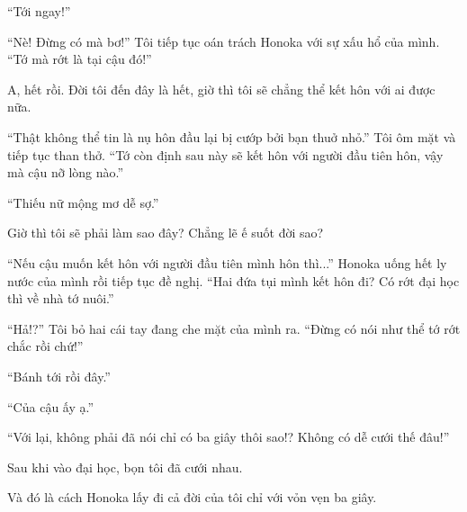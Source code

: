 {``Tới ngay!''

``Nè! Đừng có mà bơ!'' Tôi tiếp tục oán trách Honoka với sự xấu hổ của
mình. ``Tớ mà rớt là tại cậu đó!''

A, hết rồi. Đời tôi đến đây là hết, giờ thì tôi sẽ chẳng thể kết hôn với
ai được nữa.

``Thật không thể tin là nụ hôn đầu lại bị cướp bởi bạn thuở nhỏ.'' Tôi
ôm mặt và tiếp tục than thở. ``Tớ còn định sau này sẽ kết hôn với người
đầu tiên hôn, vậy mà cậu nỡ lòng nào.''

``Thiếu nữ mộng mơ dễ sợ.''

Giờ thì tôi sẽ phải làm sao đây? Chẳng lẽ ế suốt đời sao?

``Nếu cậu muốn kết hôn với người đầu tiên mình hôn thì...'' Honoka uống
hết ly nước của mình rồi tiếp tục đề nghị. ``Hai đứa tụi mình kết hôn
đi? Có rớt đại học thì về nhà tớ nuôi.''

``Hả!?'' Tôi bỏ hai cái tay đang che mặt của mình ra. ``Đừng có nói như
thể tớ rớt chắc rồi chứ!''

``Bánh tới rồi đây.''

``Của cậu ấy ạ.''

``Với lại, không phải đã nói chỉ có ba giây thôi sao!? Không có dễ cưới
thế đâu!''

Sau khi vào đại học, bọn tôi đã cưới nhau.

Và đó là cách Honoka lấy đi cả đời của tôi chỉ với vỏn vẹn ba giây.
}